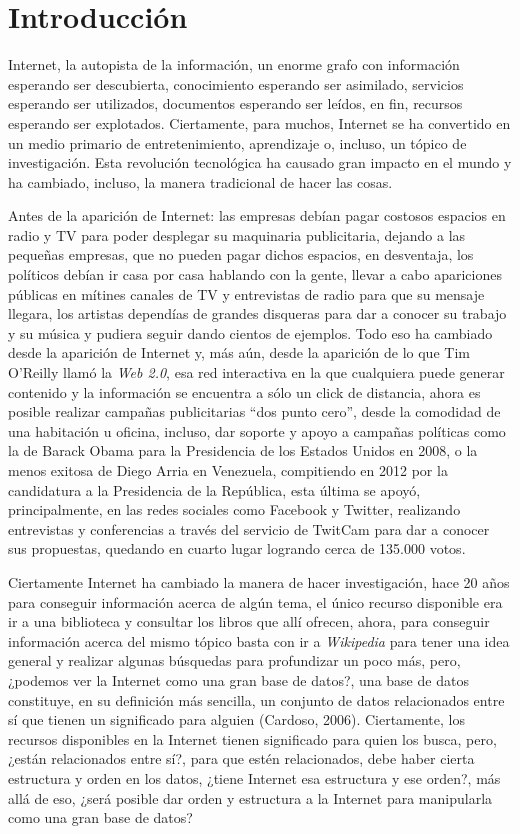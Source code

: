 \chapter*{Introducci\'on}
\label{chap:introduccion}

Internet, la autopista de la información, un enorme grafo con información esperando ser descubierta, conocimiento esperando ser asimilado, servicios esperando ser utilizados, documentos esperando ser leídos, en fin, recursos esperando ser explotados. Ciertamente, para muchos, Internet se ha convertido en un medio primario de entretenimiento, aprendizaje o, incluso, un tópico de investigación. Esta revolución tecnológica ha causado gran impacto en el mundo y ha cambiado, incluso, la manera tradicional de hacer las cosas.

Antes de la aparición de Internet: las empresas debían pagar costosos espacios en radio y TV para poder desplegar su maquinaria publicitaria, dejando a las pequeñas empresas, que no pueden pagar dichos espacios, en desventaja, los políticos debían ir casa por casa hablando con la gente, llevar a cabo apariciones públicas en mítines canales de TV y entrevistas de radio para que su mensaje llegara, los artistas dependías de grandes disqueras para dar a conocer su trabajo y su música y pudiera seguir dando cientos de ejemplos. Todo eso ha cambiado desde la aparición de Internet y, más aún, desde la aparición de lo que Tim O'Reilly llamó la \textit{Web 2.0}, esa red interactiva en la que cualquiera puede generar contenido y la información se encuentra a sólo un click de distancia, ahora es posible realizar campañas publicitarias ``dos punto cero'', desde la comodidad de una habitación u oficina, incluso, dar soporte y apoyo a campañas políticas como la de Barack Obama para la Presidencia de los Estados Unidos en 2008, o la menos exitosa de Diego Arria en Venezuela, compitiendo en 2012 por la candidatura a la Presidencia de la República, esta última se apoyó, principalmente, en las redes sociales como Facebook y Twitter, realizando entrevistas y conferencias a través del servicio de TwitCam para dar a conocer sus propuestas, quedando en cuarto lugar logrando cerca de 135.000 votos.

Ciertamente Internet ha cambiado la manera de hacer investigación, hace 20 años para conseguir información acerca de algún tema, el único recurso disponible era ir a una biblioteca y consultar los libros que allí ofrecen, ahora, para conseguir información acerca del mismo tópico basta con ir a \textit{Wikipedia} para tener una idea general y realizar algunas búsquedas para profundizar un poco más, pero, ¿podemos ver la Internet como una gran base de datos?, una base de datos constituye, en su definición más sencilla, un conjunto de datos relacionados entre sí que tienen un significado para alguien (Cardoso, 2006). Ciertamente, los recursos disponibles en la Internet tienen significado para quien los busca, pero, ¿están relacionados entre sí?, para que estén relacionados, debe haber cierta estructura y orden en los datos, ¿tiene Internet esa estructura y ese orden?, más allá de eso, ¿será posible dar orden y estructura a la Internet para manipularla como una gran base de datos?

